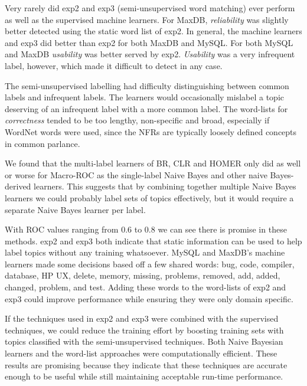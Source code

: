\documentclass[smallextended]{svjour3}       %
\begin{document}
Very rarely did \textsf{exp2} and \textsf{exp3} (semi-unsupervised word matching) ever perform as well as the supervised machine learners. 
For MaxDB, \textit{reliability} was slightly better detected using the static word list of \textsf{exp2}. 
In general, the machine learners and \textsf{exp3} did better than \textsf{exp2} for both MaxDB and MySQL. 
For both MySQL and MaxDB \textit{usability} was better served by \textsf{exp2}. 
\textit{Usability} was a very infrequent label, however, which made it difficult to detect in any case.

The semi-unsupervised labelling had difficulty distinguishing between common labels and infrequent labels. 
The learners would occasionally mislabel a topic deserving of an infrequent label with a more common label.
The word-lists for \emph{correctness} tended to be too lengthy, non-specific and broad, especially if WordNet words were used, since the NFRs are
typically loosely defined concepts in common parlance.

We found that the multi-label learners of BR, CLR and HOMER only did
as well or worse for Macro-ROC as the single-label Naive Bayes and other naive Bayes-derived learners. 
This suggests that by combining together multiple Naive Bayes learners
we could probably label sets of topics effectively, but it would
require a separate Naive Bayes learner per label.


With ROC values ranging from $0.6$ to $0.8$ we can see there is promise in these methods.
\textsf{exp2} and \textsf{exp3} both indicate that static information can be used to help label topics without any training whatsoever. 
MySQL and MaxDB's machine learners made some decisions based off a few shared words: \textsf{bug, code, compiler, database, HP UX, delete, memory,
missing, problems, removed, add, added, changed, problem, and test}. 
Adding these words to the word-lists of \textsf{exp2} and \textsf{exp3} could improve performance while ensuring they were only domain specific.

If the techniques used in \textsf{exp2} and \textsf{exp3} were combined with the supervised techniques, we could reduce the training effort by boosting
training sets with topics classified with the semi-unsupervised techniques.
Both Naive Bayesian learners and the word-list approaches were computationally efficient.  
These results are promising because they indicate that these
techniques are accurate enough to be useful while still maintaining
acceptable run-time performance.
\end{document}
